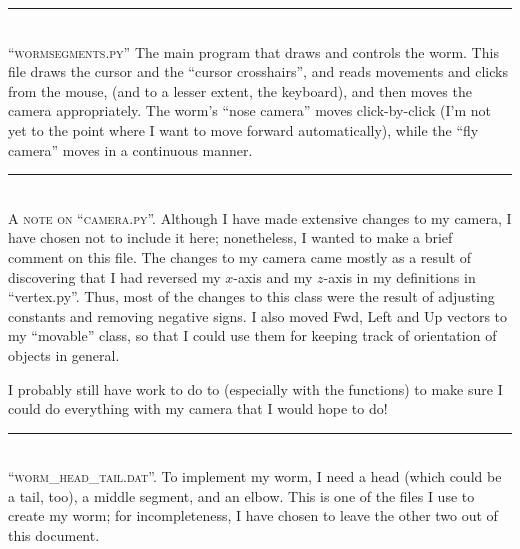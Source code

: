 \documentclass[10pt]{article}
\newcommand{\normaltitleize}[1]{\mbox{}\\ \textsc{#1} \normalsize}
\newcommand{\sectionline}{
\begin{center}
   \rule{1in}{.01in}
\end{center}
}
\begin{document}



\sectionline

\normaltitleize{``wormsegments.py''}  The main program that draws and controls the worm.  This file draws the cursor and the ``cursor crosshairs'', and reads movements and clicks from the mouse, (and to a lesser extent, the keyboard), and then moves the camera appropriately.  The worm's ``nose camera'' moves click-by-click (I'm not yet to the point where I want to move forward automatically), while the ``fly camera'' moves in a continuous manner.




\sectionline

\normaltitleize{A note on ``camera.py''.}  Although I have made extensive changes to my camera, I have chosen not to include it here; nonetheless, I wanted to make a brief comment on this file.  The changes to my camera came mostly as a result of discovering that I had reversed my $x$-axis and my $z$-axis in my definitions in ``vertex.py''.  Thus, most of the changes to this class were the result of adjusting constants and removing negative signs.  I also moved Fwd, Left and Up vectors to my ``movable'' class, so that I could use them for keeping track of orientation of objects in general.

I probably still have work to do to (especially with the functions) to make sure I could do everything with my camera that I would hope to do!

%

\sectionline

\normaltitleize{``worm\_head\_tail.dat''.}  To implement my worm, I need a head (which could be a tail, too), a middle segment, and an elbow.  This is one of the files I use to create my worm; for incompleteness, I have chosen to leave the other two out of this document.



\end{document}
